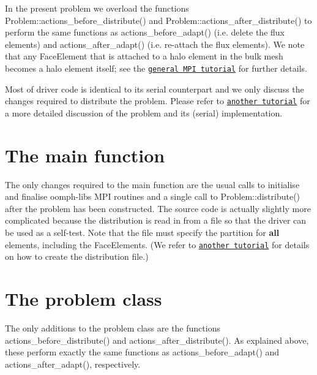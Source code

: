 In the present problem we overload the functions {\ttfamily Problem\+::actions\+\_\+before\+\_\+distribute()} and {\ttfamily Problem\+::actions\+\_\+after\+\_\+distribute()} to perform the same functions as {\ttfamily actions\+\_\+before\+\_\+adapt()} (i.\+e. delete the flux elements) and {\ttfamily actions\+\_\+after\+\_\+adapt()} (i.\+e. re-\/attach the flux elements). We note that any {\ttfamily Face\+Element} that is attached to a halo element in the bulk mesh becomes a halo element itself; see the \href{../../general_mpi/html/index.html#face_elements}{\tt general M\+PI tutorial} for further details.

Most of driver code is identical to its serial counterpart and we only discuss the changes required to distribute the problem. Please refer to \href{../../../poisson/two_d_poisson_flux_bc_adapt/html/index.html}{\tt another tutorial} for a more detailed discussion of the problem and its (serial) implementation.



\hypertarget{index_main_body}{}\section{The main function}\label{index_main_body}
The only changes required to the main function are the usual calls to initialise and finalise {\ttfamily oomph-\/lib\textquotesingle{}s} M\+PI routines and a single call to {\ttfamily Problem\+::distribute()} after the problem has been constructed. The source code is actually slightly more complicated because the distribution is read in from a file so that the driver can be used as a self-\/test. Note that the file must specify the partition for {\bfseries all} elements, including the {\ttfamily Face\+Elements}. (We refer to \href{../../adaptive_driven_cavity/html/index.html#no_disk}{\tt another tutorial} for details on how to create the distribution file.)



\hypertarget{index_problem_class}{}\section{The problem class}\label{index_problem_class}
The only additions to the problem class are the functions {\ttfamily actions\+\_\+before\+\_\+distribute()} and {\ttfamily actions\+\_\+after\+\_\+distribute()}. As explained above, these perform exactly the same functions as {\ttfamily actions\+\_\+before\+\_\+adapt()} and {\ttfamily actions\+\_\+after\+\_\+adapt()}, respectively.

